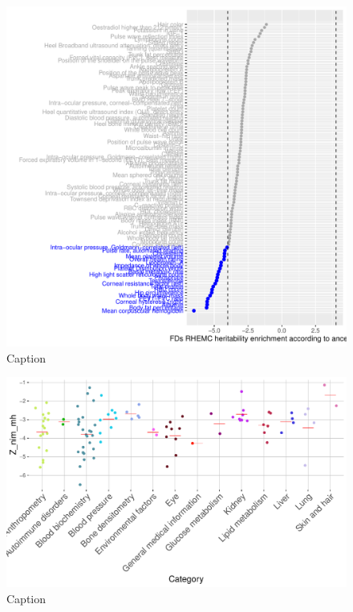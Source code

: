 \begin{figure}[htb]
    \centering
    \includegraphics[]{chapter4/figures/fds.rhemc.z_nim_mh.pdf}
    \caption{Caption}
    \label{fig:4.3}
\end{figure}
\begin{figure}[htb]
    \centering
    \includegraphics[width=\textwidth]{chapter4/figures/Z_nim_mh_category.pdf}
    \caption{Caption}
    \label{fig:4.4}
\end{figure}
\FloatBarrier
